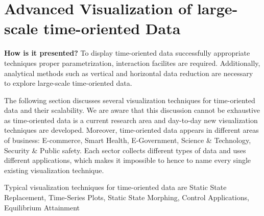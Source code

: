 \section{Advanced Visualization of large-scale time-oriented Data}
\textbf{How is it presented?}
To display time-oriented data successfully appropriate techniques
proper parametrization,
interaction facilites are required\cite{Aigner2011}. Additionally, analytical methods such as vertical and horizontal data reduction are necessary to explore large-scale time-oriented data. 

The following section discusses several visualization techniques for time-oriented data and their scalability. We are aware that this discussion cannot be exhaustive as time-oriented data is a current research area and day-to-day new visualization techniques are developed.
Moreover, time-oriented data appears in different areas of business: E-commerce, Smart Health, E-Government, Science \& Technology, Security \& Public safety. Each sector collects different types of data and uses different applications, which makes it impossible to hence to name every single existing visualization technique.

Typical visualization techniques for time-oriented data are 
Static State Replacement,
Time-Series Plots,
Static State Morphing,
Control Applications,
Equilibrium Attainment

